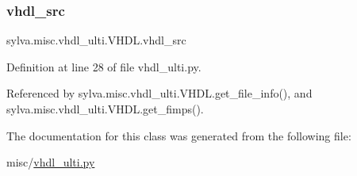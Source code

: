 \subsubsection{\texorpdfstring{vhdl\+\_\+src}{vhdl\_src}}
{\footnotesize\ttfamily sylva.\+misc.\+vhdl\+\_\+ulti.\+V\+H\+D\+L.\+vhdl\+\_\+src}



Definition at line 28 of file vhdl\+\_\+ulti.\+py.



Referenced by sylva.\+misc.\+vhdl\+\_\+ulti.\+V\+H\+D\+L.\+get\+\_\+file\+\_\+info(), and sylva.\+misc.\+vhdl\+\_\+ulti.\+V\+H\+D\+L.\+get\+\_\+fimps().



The documentation for this class was generated from the following file\+:\begin{DoxyCompactItemize}
\item 
misc/\hyperlink{vhdl__ulti_8py}{vhdl\+\_\+ulti.\+py}\end{DoxyCompactItemize}
